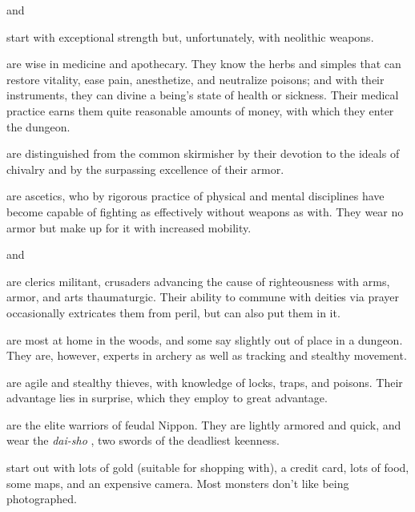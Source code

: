 %
\item[\bb{Cavemen}]%
and %
\item[\bb{Cavewomen}]%
start with exceptional strength but,
unfortunately, with neolithic weapons.

%
\item[\bb{Healers}]%
are wise in medicine and apothecary.  They know the
herbs and simples that can restore vitality, ease pain, anesthetize,
and neutralize poisons; and with their instruments, they can divine a
being's state of health or sickness.  Their medical practice earns them
quite reasonable amounts of money, with which they enter the dungeon.

%
\item[\bb{Knights}]%
are distinguished from the common skirmisher by their
devotion to the ideals of chivalry and by the surpassing excellence of
their armor.

%
\item[\bb{Monks}]%
are ascetics, who by rigorous practice of physical and mental
disciplines have become capable of fighting as effectively without weapons
as with.  They wear no armor but make up for it with increased mobility.

%
\item[\bb{Priests}]%
and %
\item[\bb{Priestesses}]%
are clerics militant, crusaders
advancing the cause of righteousness with arms, armor, and arts
thaumaturgic.  Their ability to commune with deities via prayer
occasionally extricates them from peril, but can also put them in it.

%
\item[\bb{Rangers}]%
are most at home in the woods, and some say slightly out
of place in a dungeon.  They are, however, experts in archery as well
as tracking and stealthy movement.

%
\item[\bb{Rogues}]%
are agile and stealthy thieves, with knowledge of locks,
traps, and poisons.  Their advantage lies in surprise, which they employ
to great advantage.

%
\item[\bb{Samurai}]%
are the elite warriors of feudal Nippon.  They are lightly
armored and quick, and wear the %
{\it  dai-sho}%
, two swords of the deadliest
keenness.

%
\item[\bb{Tourists}]%
start out with lots of gold (suitable for shopping with),
a credit card, lots of food, some maps, and an expensive camera.  Most
monsters don't like being photographed.

